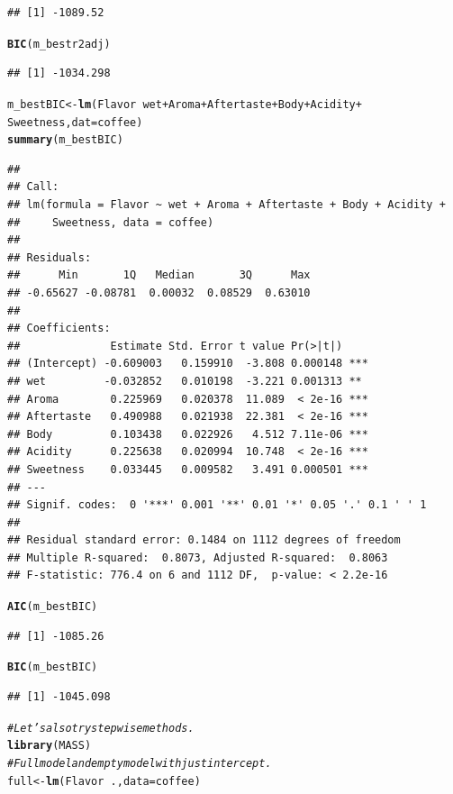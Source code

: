 \documentclass[oneside]{book}\usepackage[]{graphicx}\usepackage[dvipsnames,table,xcdraw]{xcolor}
\makeatletter
\newcommand{\hlcom}[1]{\textcolor[rgb]{0.678,0.584,0.686}{\textit{#1}}}%
\newcommand{\hlopt}[1]{\textcolor[rgb]{0,0,0}{#1}}%
\newcommand{\hlstd}[1]{\textcolor[rgb]{0.345,0.345,0.345}{#1}}%
\newcommand{\hlkwb}[1]{\textcolor[rgb]{0.69,0.353,0.396}{#1}}%
\newcommand{\hlkwc}[1]{\textcolor[rgb]{0.333,0.667,0.333}{#1}}%
\newcommand{\hlkwd}[1]{\textcolor[rgb]{0.737,0.353,0.396}{\textbf{#1}}}%
\newenvironment{kframe}{%
 \def\at@end@of@kframe{}%
 \ifinner\ifhmode%
  \def\at@end@of@kframe{\end{minipage}}%
  \begin{minipage}{\columnwidth}%
 \fi\fi%
 \def\FrameCommand##1{\hskip\@totalleftmargin \hskip-\fboxsep
 \colorbox{shadecolor}{##1}\hskip-\fboxsep
     \hskip-\linewidth \hskip-\@totalleftmargin \hskip\columnwidth}%
 \MakeFramed {\advance\hsize-\width
   \@totalleftmargin\z@ \linewidth\hsize
   \@setminipage}}%
 {\par\unskip\endMakeFramed%
 \at@end@of@kframe}
\newenvironment{knitrout}{}{} %
\makeatother
\begin{document}
\begin{knitrout}
\begin{kframe}
\begin{verbatim}
## [1] -1089.52
\end{verbatim}
\begin{alltt}
\hlkwd{BIC}\hlstd{(m_bestr2adj)}
\end{alltt}
\begin{verbatim}
## [1] -1034.298
\end{verbatim}
\begin{alltt}
\hlstd{m_bestBIC} \hlkwb{<-} \hlkwd{lm}\hlstd{(Flavor} \hlopt{~} \hlstd{wet} \hlopt{+} \hlstd{Aroma} \hlopt{+} \hlstd{Aftertaste} \hlopt{+} \hlstd{Body} \hlopt{+} \hlstd{Acidity} \hlopt{+}
  \hlstd{Sweetness,} \hlkwc{dat} \hlstd{= coffee)}
\hlkwd{summary}\hlstd{(m_bestBIC)}
\end{alltt}
\begin{verbatim}
## 
## Call:
## lm(formula = Flavor ~ wet + Aroma + Aftertaste + Body + Acidity + 
##     Sweetness, data = coffee)
## 
## Residuals:
##      Min       1Q   Median       3Q      Max 
## -0.65627 -0.08781  0.00032  0.08529  0.63010 
## 
## Coefficients:
##              Estimate Std. Error t value Pr(>|t|)    
## (Intercept) -0.609003   0.159910  -3.808 0.000148 ***
## wet         -0.032852   0.010198  -3.221 0.001313 ** 
## Aroma        0.225969   0.020378  11.089  < 2e-16 ***
## Aftertaste   0.490988   0.021938  22.381  < 2e-16 ***
## Body         0.103438   0.022926   4.512 7.11e-06 ***
## Acidity      0.225638   0.020994  10.748  < 2e-16 ***
## Sweetness    0.033445   0.009582   3.491 0.000501 ***
## ---
## Signif. codes:  0 '***' 0.001 '**' 0.01 '*' 0.05 '.' 0.1 ' ' 1
## 
## Residual standard error: 0.1484 on 1112 degrees of freedom
## Multiple R-squared:  0.8073,	Adjusted R-squared:  0.8063 
## F-statistic: 776.4 on 6 and 1112 DF,  p-value: < 2.2e-16
\end{verbatim}
\begin{alltt}
\hlkwd{AIC}\hlstd{(m_bestBIC)}
\end{alltt}
\begin{verbatim}
## [1] -1085.26
\end{verbatim}
\begin{alltt}
\hlkwd{BIC}\hlstd{(m_bestBIC)}
\end{alltt}
\begin{verbatim}
## [1] -1045.098
\end{verbatim}
\begin{alltt}
\hlcom{# Let's also try stepwise methods.}
\hlkwd{library}\hlstd{(MASS)}
\hlcom{# Full model and empty model with just intercept.}
\hlstd{full} \hlkwb{<-} \hlkwd{lm}\hlstd{(Flavor} \hlopt{~} \hlstd{.,} \hlkwc{data} \hlstd{= coffee)}

\end{alltt}
\end{kframe}
\end{knitrout}
\end{document}
